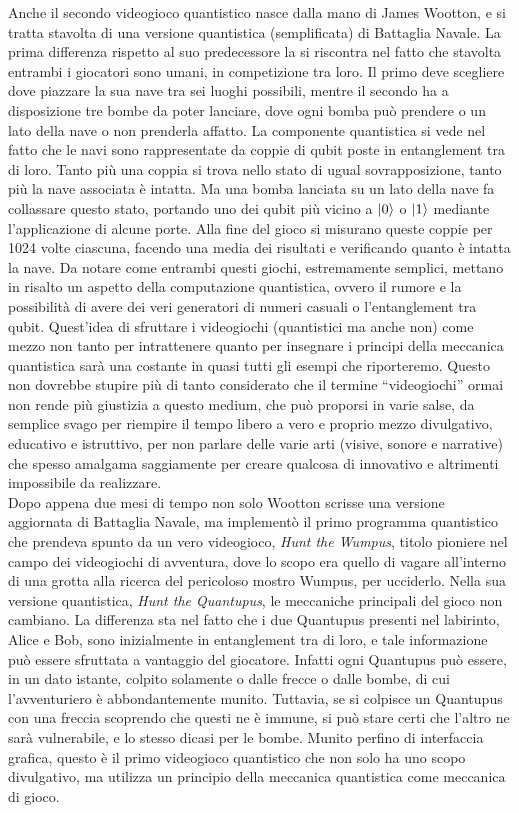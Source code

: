 \documentclass{book}
\theoremstyle{definition}
\theoremstyle{definition}
\theoremstyle{definition}
\theoremstyle{plain}
\theoremstyle{plain}
\theoremstyle{plain}
\theoremstyle{plain}
\begin{document}
Anche il secondo videogioco quantistico nasce dalla mano di James Wootton, e si tratta stavolta di una versione quantistica (semplificata) di Battaglia Navale\cite{wootton_quantum_battleship}. La prima differenza rispetto al suo predecessore la si riscontra nel fatto che stavolta entrambi i giocatori sono umani, in competizione tra loro. Il primo deve scegliere dove piazzare la sua nave tra sei luoghi possibili, mentre il secondo ha a disposizione tre bombe da poter lanciare, dove ogni bomba può prendere o un lato della nave o non prenderla affatto. La componente quantistica si vede nel fatto che le navi sono rappresentate da coppie di qubit poste in entanglement tra di loro. Tanto più una coppia si trova nello stato di ugual sovrapposizione, tanto più la nave associata è intatta. Ma una bomba lanciata su un lato della nave fa collassare questo stato, portando uno dei qubit più vicino a $\ket{0}$ o $\ket{1}$ mediante l'applicazione di alcune porte. Alla fine del gioco si misurano queste coppie per 1024 volte ciascuna, facendo una media dei risultati e verificando quanto è intatta la nave. Da notare come entrambi questi giochi, estremamente semplici, mettano in risalto un aspetto della computazione quantistica, ovvero il rumore e la possibilità di avere dei veri generatori di numeri casuali o l'entanglement tra qubit. Quest'idea di sfruttare i videogiochi (quantistici ma anche non) come mezzo non tanto per intrattenere quanto per insegnare i principi della meccanica quantistica sarà una costante in quasi tutti gli esempi che riporteremo. Questo non dovrebbe stupire più di tanto considerato che il termine ``videogiochi'' ormai non rende più giustizia a questo medium, che può proporsi in varie salse, da semplice svago per riempire il tempo libero a vero e proprio mezzo divulgativo, educativo e istruttivo, per non parlare delle varie arti (visive, sonore e narrative) che spesso amalgama saggiamente per creare qualcosa di innovativo e altrimenti impossibile da realizzare.\\
Dopo appena due mesi di tempo non solo Wootton scrisse una versione aggiornata di Battaglia Navale, ma implementò il primo programma quantistico che prendeva spunto da un vero videogioco, \emph{Hunt the Wumpus}, titolo pioniere nel campo dei videogiochi di avventura, dove lo scopo era quello di vagare all'interno di una grotta alla ricerca del pericoloso mostro Wumpus, per ucciderlo. Nella sua versione quantistica, \emph{Hunt the Quantupus}\cite{wootton_quantupus}, le meccaniche principali del gioco non cambiano. La differenza sta nel fatto che i due Quantupus presenti nel labirinto, Alice e Bob, sono inizialmente in entanglement tra di loro, e tale informazione può essere sfruttata a vantaggio del giocatore. Infatti ogni Quantupus può essere, in un dato istante, colpito solamente o dalle frecce o dalle bombe, di cui l'avventuriero è abbondantemente munito. Tuttavia, se si colpisce un Quantupus con una freccia scoprendo che questi ne è immune, si può stare certi che l'altro ne sarà vulnerabile, e lo stesso dicasi per le bombe. Munito perfino di interfaccia grafica, questo è il primo videogioco quantistico che non solo ha uno scopo divulgativo, ma utilizza un principio della meccanica quantistica come meccanica di gioco.
\end{document}
